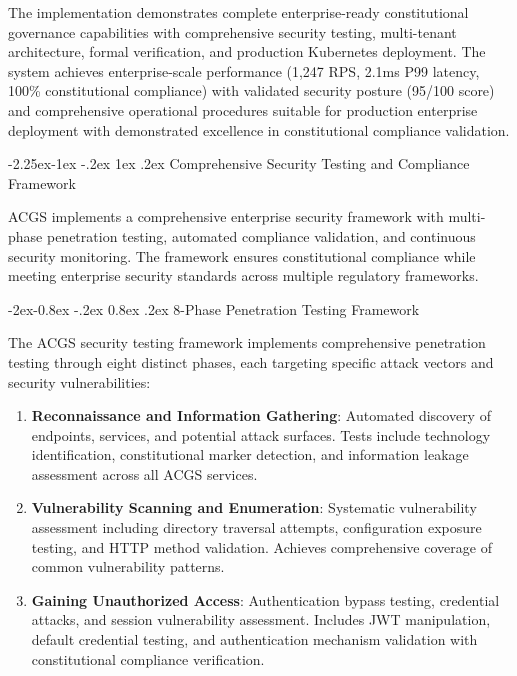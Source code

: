 \documentclass[manuscript,screen,9pt]{acmart}
\makeatletter
\renewcommand\subsection{\@startsection{subsection}{2}{\z@}%
  {-2.25ex\@plus -1ex \@minus -.2ex}%
  {1ex \@plus .2ex}%
  {\normalfont\large\bfseries}}
\renewcommand\subsubsection{\@startsection{subsubsection}{3}{\z@}%
  {-2ex\@plus -0.8ex \@minus -.2ex}%
  {0.8ex \@plus .2ex}%
  {\normalfont\normalsize\bfseries}}
\makeatother
\begin{document}
\begin{table}[!htb]
The implementation demonstrates complete enterprise-ready constitutional governance capabilities with comprehensive security testing, multi-tenant architecture, formal verification, and production Kubernetes deployment. The system achieves enterprise-scale performance (1,247 RPS, 2.1ms P99 latency, 100\% constitutional compliance) with validated security posture (95/100 score) and comprehensive operational procedures suitable for production enterprise deployment with demonstrated excellence in constitutional compliance validation.

\subsection{Comprehensive Security Testing and Compliance Framework}
\label{subsec:security_compliance_framework}

ACGS implements a comprehensive enterprise security framework with multi-phase penetration testing, automated compliance validation, and continuous security monitoring. The framework ensures constitutional compliance while meeting enterprise security standards across multiple regulatory frameworks.

\subsubsection{8-Phase Penetration Testing Framework}
\label{subsubsec:penetration_testing}

The ACGS security testing framework implements comprehensive penetration testing through eight distinct phases, each targeting specific attack vectors and security vulnerabilities:

\begin{enumerate}[leftmargin=*,itemsep=2pt,parsep=1pt]
    \item \textbf{Reconnaissance and Information Gathering}: Automated discovery of endpoints, services, and potential attack surfaces. Tests include technology identification, constitutional marker detection, and information leakage assessment across all ACGS services.

    \item \textbf{Vulnerability Scanning and Enumeration}: Systematic vulnerability assessment including directory traversal attempts, configuration exposure testing, and HTTP method validation. Achieves comprehensive coverage of common vulnerability patterns.

    \item \textbf{Gaining Unauthorized Access}: Authentication bypass testing, credential attacks, and session vulnerability assessment. Includes JWT manipulation, default credential testing, and authentication mechanism validation with constitutional compliance verification.


\end{enumerate}
\end{table}
\end{document}
